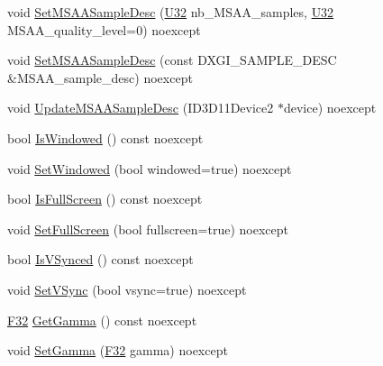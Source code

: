 \begin{DoxyCompactItemize}
\item 
void \hyperlink{structmage_1_1_display_configuration_a5bc7c91f769b58c1e021abf278e699c6}{Set\+M\+S\+A\+A\+Sample\+Desc} (\hyperlink{namespacemage_a41c104c036fba3756a74e19f793eeaa1}{U32} nb\+\_\+\+M\+S\+A\+A\+\_\+samples, \hyperlink{namespacemage_a41c104c036fba3756a74e19f793eeaa1}{U32} M\+S\+A\+A\+\_\+quality\+\_\+level=0) noexcept
\item 
void \hyperlink{structmage_1_1_display_configuration_abf2e5e21fe3fdde7a95fd518a882a8d1}{Set\+M\+S\+A\+A\+Sample\+Desc} (const D\+X\+G\+I\+\_\+\+S\+A\+M\+P\+L\+E\+\_\+\+D\+E\+SC \&M\+S\+A\+A\+\_\+sample\+\_\+desc) noexcept
\item 
void \hyperlink{structmage_1_1_display_configuration_a8eb7b1f0d0dbdd7ab384f61955609496}{Update\+M\+S\+A\+A\+Sample\+Desc} (I\+D3\+D11\+Device2 $\ast$device) noexcept
\item 
bool \hyperlink{structmage_1_1_display_configuration_ae35fedcd9989950c5f15785632dd7a86}{Is\+Windowed} () const noexcept
\item 
void \hyperlink{structmage_1_1_display_configuration_ac6228139b3fae3b5fb454aa072b94efd}{Set\+Windowed} (bool windowed=true) noexcept
\item 
bool \hyperlink{structmage_1_1_display_configuration_ab984b32ff2b6ce6a376aa09399b9b45e}{Is\+Full\+Screen} () const noexcept
\item 
void \hyperlink{structmage_1_1_display_configuration_a570746cd01c6a95c217aa03a954b5fd1}{Set\+Full\+Screen} (bool fullscreen=true) noexcept
\item 
bool \hyperlink{structmage_1_1_display_configuration_ab237c9b7953853eb83a51d542dfffb5e}{Is\+V\+Synced} () const noexcept
\item 
void \hyperlink{structmage_1_1_display_configuration_a7a14343be4f07dcdf4e8be66a118da29}{Set\+V\+Sync} (bool vsync=true) noexcept
\item 
\hyperlink{namespacemage_aa97e833b45f06d60a0a9c4fc22ae02c0}{F32} \hyperlink{structmage_1_1_display_configuration_a7b86a9b87951e560bc910d6537dc2f2f}{Get\+Gamma} () const noexcept
\item 
void \hyperlink{structmage_1_1_display_configuration_a83f33815b5a7d644e33335781a549718}{Set\+Gamma} (\hyperlink{namespacemage_aa97e833b45f06d60a0a9c4fc22ae02c0}{F32} gamma) noexcept
\end{DoxyCompactItemize}
